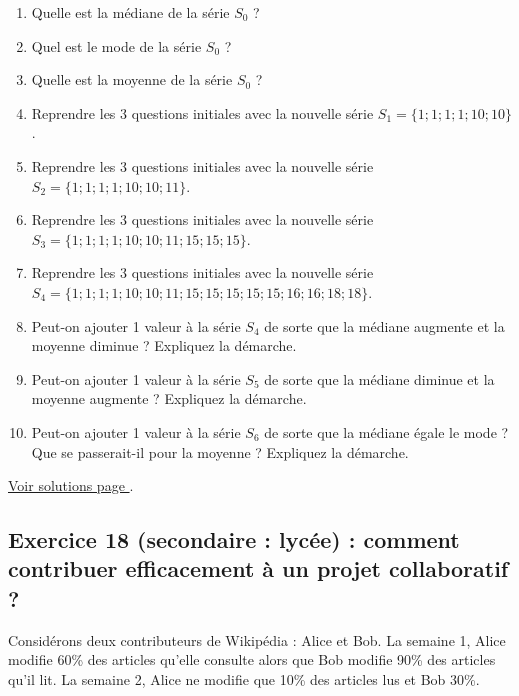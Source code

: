 \begin{enumerate}[label=C\arabic*)]
	\item Quelle est la médiane de  la série $S_0$ ?
	\item Quel est le mode de  la série $S_0$ ? 
	\item Quelle est la moyenne de  la série $S_0$ ?
	\item Reprendre les 3 questions initiales avec la nouvelle série $S_1 = \{1 ; 1 ; 1 ; 1 ; 10 ; 10\}$. 
	\item Reprendre les 3 questions initiales avec la nouvelle série $S_2 = \{1 ; 1 ; 1 ; 1 ; 10 ; 10 ; 11\}$. 
	\item Reprendre les 3 questions initiales avec la nouvelle série $S_3 = \{1 ; 1 ; 1 ; 1 ; 10 ; 10 ; 11 ; 15 ; 15 ; 15\}$. 
	\item Reprendre les 3 questions initiales avec la nouvelle série $S_4 = \{1 ; 1 ; 1 ; 1 ; 10 ; 10 ; 11 ; 15 ; 15 ; 15 ; 15 ; 15 ; 16 ; 16 ; 18 ; 18\}$. 
	\item Peut-on ajouter 1 valeur à la série $S_4$ de sorte que la médiane augmente et la moyenne diminue ? Expliquez la démarche.
	\item Peut-on ajouter 1 valeur à la série $S_5$ de sorte que la médiane diminue et la moyenne augmente ? Expliquez la démarche.
	\item Peut-on ajouter 1 valeur à la série $S_6$ de sorte que la médiane égale le mode ? Que se passerait-il pour la moyenne ? Expliquez la démarche.
\end{enumerate}

\hyperref[sol:niveau17]{Voir solutions page \pageref{sol:niveau17}}.

\newpage

\subsection{Exercice 18 (secondaire : lycée) : comment contribuer efficacement à un projet collaboratif ?}

\label{calc:niveau18}

Considérons deux contributeurs de Wikipédia : Alice et Bob. La semaine 1, Alice modifie 60\% des articles qu'elle consulte alors que Bob modifie 90\% des articles qu'il lit. La semaine 2, Alice ne modifie que 10\% des articles lus et Bob 30\%. 

